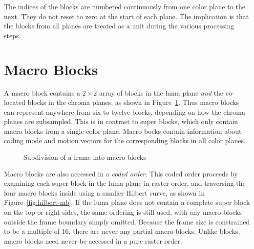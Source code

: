 \documentclass[11pt,letterpaper]{book}
\newcommand{\term}[1]{{\em #1}}
\numberwithin{equation}{chapter}
\numberwithin{figure}{chapter}
\numberwithin{table}{chapter}
\begin{document}
The indices of the blocks are numbered continuously from one color plane to the
 next.
They do not reset to zero at the start of each plane.
The implication is that the blocks from all planes are treated as a unit during
 the various processing steps.

\section{Macro Blocks}
\label{sec:mbs}

A macro block contains a $2\times 2$ array of blocks in the luma plane
 {\em and} the co-located blocks in the chroma planes, as shown in Figure~\ref{fig:macroblock}.
Thus macro blocks can represent anywhere from six to twelve blocks, depending
 on how the chroma planes are subsampled.
This is in contrast to super blocks, which only contain macro blocks from a
 single color plane.
Macro bocks contain information about coding mode and motion vectors for the
 corresponding blocks in all color planes.

\begin{figure}[htb]
 \begin{center}
 
 \end{center}
 \caption{Subdivision of a frame into macro blocks}
 \label{fig:macroblock}
\end{figure}

Macro blocks are also accessed in a \term{coded order}.
This coded order proceeds by examining each super block in the luma plane in
 raster order, and traversing the four macro blocks inside using a smaller
 Hilbert curve, as shown in Figure~\ref{fig:hilbert-mb}.
If the luma plane does not contain a complete super block on the top or right
 sides, the same ordering is still used, with any macro blocks outside
 the frame boundary simply omitted.
Because the frame size is constrained to be a multiple of 16, there are never
 any partial macro blocks.
Unlike blocks, macro blocks need never be accessed in a pure raster order.
\end{document}
